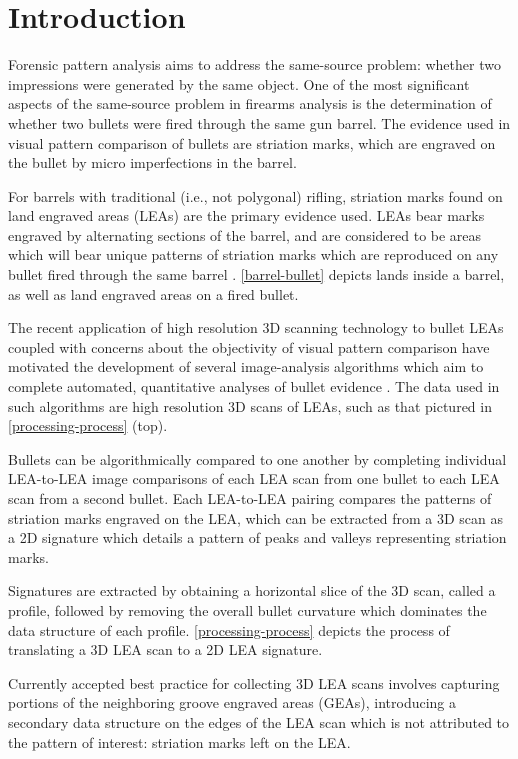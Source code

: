 \documentclass[12pt]{article}
\begin{document}
\section{Introduction}

Forensic pattern analysis aims to address the same-source problem:
whether two impressions were generated by the same object. One of the
most significant aspects of the same-source problem in firearms analysis
is the determination of whether two bullets were fired through the same
gun barrel. The evidence used in visual pattern comparison of bullets
are striation marks, which are engraved on the bullet by micro
imperfections in the barrel.

For barrels with traditional (i.e., not polygonal) rifling, striation
marks found on land engraved areas (LEAs) are the primary evidence used.
LEAs bear marks engraved by alternating sections of the barrel, and are
considered to be areas which will bear unique patterns of striation
marks which are reproduced on any bullet fired through the same barrel
\cite{AFTE}. \autoref{barrel-bullet} depicts lands inside a barrel, as
well as land engraved areas on a fired bullet.

The recent application of high resolution 3D scanning technology to
bullet LEAs coupled with concerns about the objectivity of visual
pattern comparison have motivated the development of several
image-analysis algorithms which aim to complete automated, quantitative
analyses of bullet evidence
\citep[see][]{DeKinder1, DeKinder2, Bachrach1, Ma1, Chu1, Chu2, Hare1}.
The data used in such algorithms are high resolution 3D scans of LEAs,
such as that pictured in \autoref{processing-process} (top).

Bullets can be algorithmically compared to one another by completing
individual LEA-to-LEA image comparisons of each LEA scan from one bullet
to each LEA scan from a second bullet. Each LEA-to-LEA pairing compares
the patterns of striation marks engraved on the LEA, which can be
extracted from a 3D scan as a 2D signature which details a pattern of
peaks and valleys representing striation marks.

Signatures are extracted by obtaining a horizontal slice of the 3D scan,
called a profile, followed by removing the overall bullet curvature
which dominates the data structure of each profile.
\autoref{processing-process} depicts the process of translating a 3D LEA
scan to a 2D LEA signature.

Currently accepted best practice for collecting 3D LEA scans involves
capturing portions of the neighboring groove engraved areas (GEAs),
introducing a secondary data structure on the edges of the LEA scan
which is not attributed to the pattern of interest: striation marks left
on the LEA.
\end{document}
